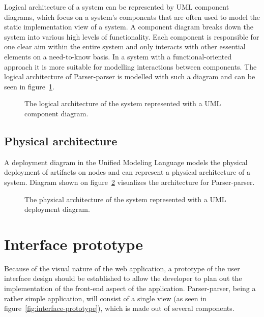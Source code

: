 \documentclass[english,engineering]{wizthesis}
\newcommand{\paraphrase}[1]{#1}
\newcommand{\thisproject}{Parser-parser}
\begin{document}
Logical architecture of a system can be represented by UML component diagrams,
which focus on a system's components that are often used to model the static
implementation view of a system. \paraphrase{A component diagram breaks down the
system into various high levels of functionality. Each component is responsible
for one clear aim within the entire system and only interacts with other
essential elements on a need-to-know basis.} In a system with a
functional-oriented approach it is more suitable for modelling interactions
between components. The logical architecture of \thisproject{} is modelled with
such a diagram and can be seen in figure~\ref{fig:logical-architecture}.

\begin{figure}[H]
  \centering
  \resizebox{0.8\textwidth}{!}{\small}
  \caption{The logical architecture of the system represented with a UML
  component diagram.}
  \label{fig:logical-architecture}
\end{figure}

\subsection{Physical architecture}

A deployment diagram in the Unified Modeling Language models the physical
deployment of artifacts on nodes and can represent a physical architecture of
a system. Diagram shown on figure~\ref{fig:physical-architecture} visualizes
the architecture for \thisproject{}.

\begin{figure}[H]
  \centering
  \resizebox{\textwidth}{!}{\footnotesize}
  \caption{The physical architecture of the system represented with a UML
  deployment diagram.}
  \label{fig:physical-architecture}
\end{figure}

\section{Interface prototype} \label{sec:interface-prototype}

Because of the visual nature of the web application, a prototype of the user
interface design should be established to allow the developer to plan out the
implementation of the front-end aspect of the application. \thisproject{}, being
a rather simple application, will consist of a single view (as seen in
figure~\ref{fig:interface-prototype}), which is made out of several components.
\end{document}
